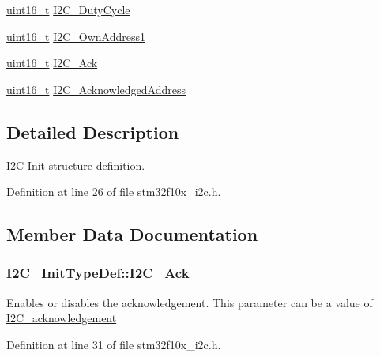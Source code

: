 \begin{DoxyCompactItemize}
\item 
\hyperlink{_p_e___types_8h_a1f1825b69244eb3ad2c7165ddc99c956}{uint16\+\_\+t} \hyperlink{struct_i2_c___init_type_def_aff23b28652359513dfd268dee54c3279}{I2\+C\+\_\+\+Duty\+Cycle}
\item 
\hyperlink{_p_e___types_8h_a1f1825b69244eb3ad2c7165ddc99c956}{uint16\+\_\+t} \hyperlink{struct_i2_c___init_type_def_a08543cb71b4b2a89ad81a2cefff12b53}{I2\+C\+\_\+\+Own\+Address1}
\item 
\hyperlink{_p_e___types_8h_a1f1825b69244eb3ad2c7165ddc99c956}{uint16\+\_\+t} \hyperlink{struct_i2_c___init_type_def_a7bcae26f098e897832e5e42b055f8c98}{I2\+C\+\_\+\+Ack}
\item 
\hyperlink{_p_e___types_8h_a1f1825b69244eb3ad2c7165ddc99c956}{uint16\+\_\+t} \hyperlink{struct_i2_c___init_type_def_a300e847972f50b0d25c4f13be5d93d79}{I2\+C\+\_\+\+Acknowledged\+Address}
\end{DoxyCompactItemize}


\subsection{Detailed Description}
I2C Init structure definition. 

Definition at line 26 of file stm32f10x\+\_\+i2c.\+h.



\subsection{Member Data Documentation}
\subsubsection[{\texorpdfstring{I2\+C\+\_\+\+Ack}{I2C_Ack}}]{ I2\+C\+\_\+\+Init\+Type\+Def\+::\+I2\+C\+\_\+\+Ack}\hypertarget{struct_i2_c___init_type_def_a3ee454a81b4520ee58d687fd6484d65c}{}\label{struct_i2_c___init_type_def_a3ee454a81b4520ee58d687fd6484d65c}
Enables or disables the acknowledgement. This parameter can be a value of \hyperlink{group___i2_c__acknowledgement}{I2\+C\+\_\+acknowledgement} 

Definition at line 31 of file stm32f10x\+\_\+i2c.\+h.

